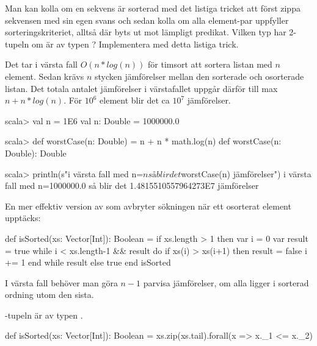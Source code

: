\Subtask \label{subtask:isSorted-zip} Man kan kolla om en sekvens är sorterad med det listiga tricket att först zippa sekvensen med sin egen svans och sedan kolla om alla element-par uppfyller sorteringskriteriet, alltså  där  byts ut mot lämpligt predikat. Vilken typ har 2-tupeln  om  är av typen ? Implementera  med detta listiga trick. 

\SOLUTION


\TaskSolved \what



\SubtaskSolved Det tar i värsta fall $O(n*log(n))$ för timsort att sortera listan med $n$ element. Sedan krävs $n$ stycken jämförelser mellan den sorterade och osorterade listan. Det totala antalet jämförelser i värstafallet uppgår därför till max $n + n*log(n)$. För $10^6$ element blir det ca $10^7$ jämförelser.
\begin{REPLnonum}
scala> val n = 1E6
val n: Double = 1000000.0

scala> def worstCase(n: Double) = n + n * math.log(n)
def worstCase(n: Double): Double

scala> println(s"i värsta fall med n=$n så blir det ${worstCase(n)} jämförelser")
i värsta fall med n=1000000.0 så blir det 1.4815510557964273E7 jämförelser
\end{REPLnonum}

\SubtaskSolved En mer effektiv version av  som avbryter sökningen när ett osorterat element upptäcks:
\begin{Code}
def isSorted(xs: Vector[Int]): Boolean = 
  if xs.length > 1 then
    var i = 0
    var result = true
    while i < xs.length-1 && result do 
      if xs(i) > xs(i+1) then result = false
      i += 1
    end while
    result
  else true
end isSorted
\end{Code}

\SubtaskSolved I värsta fall behöver man göra $n - 1$ parvisa jämförelser, om alla ligger i sorterad ordning utom den sista.


-tupeln är av typen .

\begin{Code}
def isSorted(xs: Vector[Int]): Boolean =
  xs.zip(xs.tail).forall(x => x._1 <= x._2)
\end{Code}



\QUESTEND






